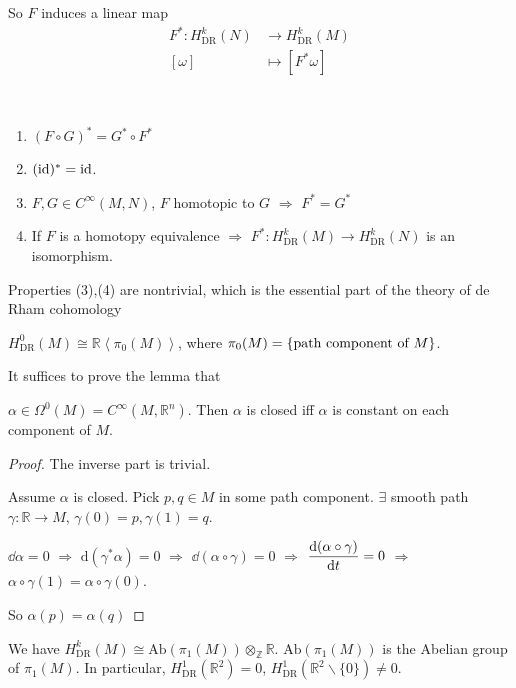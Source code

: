So  $ F $ induces a linear map
\begin{equation*}
    \begin{aligned}
        F^*:H^k_{\mathrm{DR}}(N)&\rightarrow H^k_{\mathrm{DR}}(M)\\
        [\omega]&\mapsto [F^*\omega]
    \end{aligned}
\end{equation*}
\begin{proposition}\label{key properties of de Rham cohomology}
    \,
    \begin{enumerate}[label=(\arabic*)]
        \item  $ (F\circ G)^*=G^* \circ F^* $
        \item  $ (\mathrm{id})^*=\mathrm{id} $.
        \item  $ F,G\in C^\infty(M,N) $,  $ F $ homotopic to  $ G $ $ \Rightarrow  $ $ F^*=G^* $
        \item If  $ F $ is a homotopy equivalence $ \Rightarrow $  $ F^*:H^k_{\mathrm{DR}}(M)\rightarrow H^k_{\mathrm{DR}}(N) $  is an isomorphism.
    \end{enumerate}
\end{proposition}
\begin{remark}
    Properties (3),(4) are nontrivial, which is the essential part of the theory of de Rham cohomology
\end{remark}
\begin{proposition}\label{Computation of cohomology at 0}
     $ H^0_{\mathrm{DR}}(M)\cong \mathbb{R} \left<\pi_0(M)\right>$, where  $ \pi_0(M)=\{\text{path component of  $ M $}\} $.
\end{proposition}
It suffices to prove the lemma that
\begin{lemma}
     $ \alpha\in \Omega^0(M)=C^\infty(M,\mathbb{R}^n) $. Then $ \alpha $ is closed iff  $ \alpha $  is constant on each component of  $ M $.
\end{lemma}
\begin{proof}
    The inverse part is trivial.

    Assume  $ \alpha $ is closed. Pick  $ p,q\in M $ in some path component.  $ \exists $ smooth path  $ \gamma:\mathbb{R}\rightarrow M $,  $ \gamma(0)=p,\gamma(1)=q $.

    $ \dd \alpha=0 $ $ \Rightarrow  $  $ \mathrm{d}(\gamma^*\alpha)=0 $ $ \Rightarrow  $  $ \dd(\alpha\circ \gamma)=0 $  $ \Rightarrow $ $ \displaystyle\frac{\mathrm{d} (\alpha\circ \gamma)}{\mathrm{d} t}=0 $ $ \Rightarrow  $ $ \alpha\circ \gamma(1)=\alpha\circ\gamma(0) $.

    So  $ \alpha(p)=\alpha(q) $
\end{proof}
We have  $ H^k_{\mathrm{DR}}(M)\cong \mathrm{Ab}(\pi_1(M))\otimes_\mathbb{Z} \mathbb{R} $.  $  \mathrm{Ab}(\pi_1(M)) $ is the Abelian group of  $ \pi_1(M) $. In particular,  $ H^1_{\mathrm{DR}}(\mathbb R^2)=0 $,  $ H^1_{\mathrm{DR}}(\mathbb R^2\backslash \{0\})\neq 0 $.


